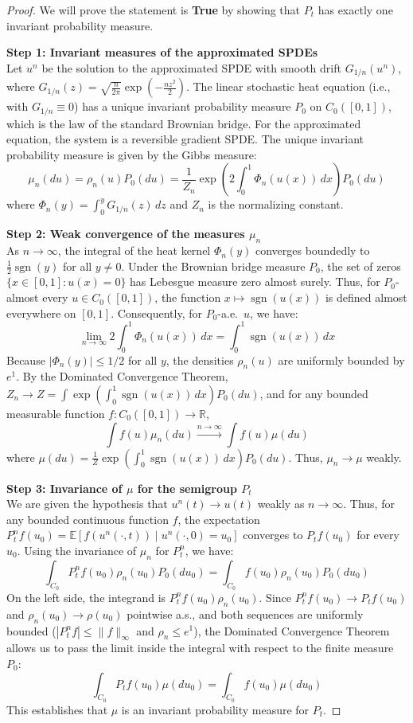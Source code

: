 \begin{proof}
We will prove the statement is \textbf{True} by showing that $P_t$ has exactly one invariant probability measure.

\medskip\noindent
\textbf{Step 1: Invariant measures of the approximated SPDEs}\\
Let $u^n$ be the solution to the approximated SPDE with smooth drift $G_{1/n}(u^n)$, where $G_{1/n}(z) = \sqrt{\frac{n}{2\pi}} \exp\left(-\frac{n z^2}{2}\right)$. 
The linear stochastic heat equation (i.e., with $G_{1/n} \equiv 0$) has a unique invariant probability measure $P_0$ on $C_0([0,1])$, which is the law of the standard Brownian bridge. 
For the approximated equation, the system is a reversible gradient SPDE. The unique invariant probability measure is given by the Gibbs measure:
\[ \mu_n(du) = \rho_n(u) P_0(du) = \frac{1}{Z_n} \exp\left(2 \int_0^1 \Phi_n(u(x)) \, dx\right) P_0(du) \]
where $\Phi_n(y) = \int_0^y G_{1/n}(z) \, dz$ and $Z_n$ is the normalizing constant.

\medskip\noindent
\textbf{Step 2: Weak convergence of the measures $\mu_n$}\\
As $n \to \infty$, the integral of the heat kernel $\Phi_n(y)$ converges boundedly to $\frac{1}{2}\operatorname{sgn}(y)$ for all $y \neq 0$. 
Under the Brownian bridge measure $P_0$, the set of zeros $\{x \in [0,1] : u(x) = 0\}$ has Lebesgue measure zero almost surely. Thus, for $P_0$-almost every $u \in C_0([0,1])$, the function $x \mapsto \operatorname{sgn}(u(x))$ is defined almost everywhere on $[0,1]$.
Consequently, for $P_0$-a.e.\ $u$, we have:
\[ \lim_{n\to\infty} 2\int_0^1 \Phi_n(u(x)) \, dx = \int_0^1 \operatorname{sgn}(u(x)) \, dx \]
Because $|\Phi_n(y)| \le 1/2$ for all $y$, the densities $\rho_n(u)$ are uniformly bounded by $e^1$. By the Dominated Convergence Theorem, $Z_n \to Z = \int \exp\left(\int_0^1 \operatorname{sgn}(u(x)) \, dx\right) P_0(du)$, and for any bounded measurable function $f\colon C_0([0,1]) \to \mathbb{R}$,
\[ \int f(u) \mu_n(du) \xrightarrow{n \to \infty} \int f(u) \mu(du) \]
where $\mu(du) = \frac{1}{Z} \exp\left( \int_0^1 \operatorname{sgn}(u(x)) \, dx \right) P_0(du)$. Thus, $\mu_n \to \mu$ weakly.

\medskip\noindent
\textbf{Step 3: Invariance of $\mu$ for the semigroup $P_t$}\\
We are given the hypothesis that $u^n(t) \to u(t)$ weakly as $n \to \infty$. Thus, for any bounded continuous function $f$, the expectation $P^n_t f(u_0) = \mathbb{E}[f(u^n(\cdot, t)) \mid u^n(\cdot, 0) = u_0]$ converges to $P_t f(u_0)$ for every $u_0$.
Using the invariance of $\mu_n$ for $P^n_t$, we have:
\[ \int_{C_0} P^n_t f(u_0) \rho_n(u_0) P_0(du_0) = \int_{C_0} f(u_0) \rho_n(u_0) P_0(du_0) \]
On the left side, the integrand is $P^n_t f(u_0) \rho_n(u_0)$. Since $P^n_t f(u_0) \to P_t f(u_0)$ and $\rho_n(u_0) \to \rho(u_0)$ pointwise a.s., and both sequences are uniformly bounded ($|P^n_t f| \le \|f\|_\infty$ and $\rho_n \le e^1$), the Dominated Convergence Theorem allows us to pass the limit inside the integral with respect to the finite measure $P_0$:
\[ \int_{C_0} P_t f(u_0) \mu(du_0) = \int_{C_0} f(u_0) \mu(du_0) \]
This establishes that $\mu$ is an invariant probability measure for $P_t$. 


\end{proof}
